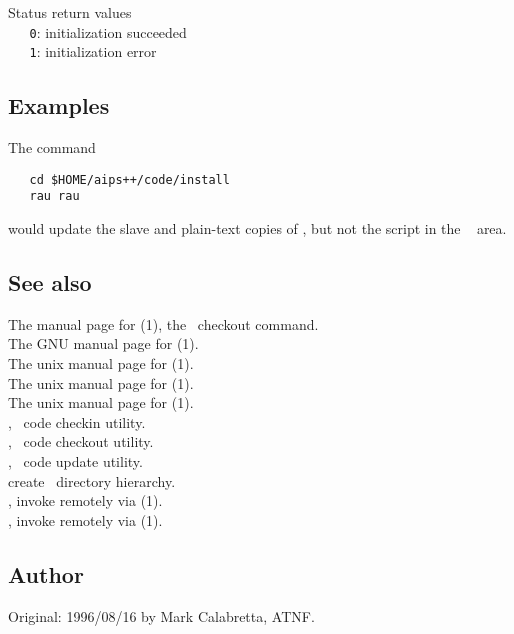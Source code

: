 Status return values
\\ \verb+   0+:  initialization succeeded
\\ \verb+   1+:  initialization error
 
\subsection*{Examples}
 
The command
 
\begin{verbatim}
   cd $HOME/aips++/code/install
   rau rau
\end{verbatim}
 
\noindent
would update the slave and plain-text copies of , but not the script
in the \aipspp\  area.

\subsection*{See also}

The manual page for (1), the \rcs\ checkout command.\\
The GNU manual page for (1).\\
The unix manual page for (1).\\
The unix manual page for (1).\\
The unix manual page for (1).\\
, \aipspp\ code checkin utility.\\
, \aipspp\ code checkout utility.\\
, \aipspp\ code update utility.\\
 create \aipspp\ directory hierarchy.\\
, invoke  remotely via (1).\\
, invoke  remotely via (1).
 
\subsection*{Author}

Original: 1996/08/16 by Mark Calabretta, ATNF.

 
\newpage
\section{}
\label{rcscat}
 
